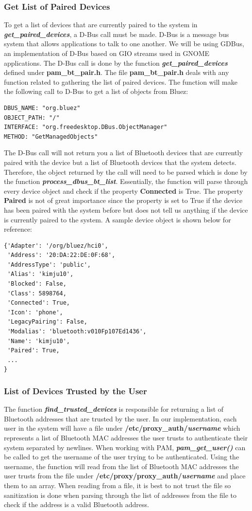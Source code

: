 \documentclass[letterpaper,twocolumn,10pt]{article}
\begin{document}
\subsubsection{Get List of Paired Devices}
To get a list of devices that are currently paired to the system in \textbf{\emph{get\_paired\_devices}}, a D-Bus call must be made. D-Bus is a message bus system that allows applications to talk to one another. We will be using GDBus, an implementation of D-Bus based on GIO streams used in GNOME applications. The D-Bus call is done by the function \textbf{\emph{get\_paired\_devices}} defined under \textbf{pam\_bt\_pair.h}. The file \textbf{pam\_bt\_pair.h} deals with any function related to gathering the list of paired devices. The function will make the following call to D-Bus to get a list of objects from Bluez: 
{\small
\begin{lstlisting}
DBUS_NAME: "org.bluez"
OBJECT_PATH: "/"
INTERFACE: "org.freedesktop.DBus.ObjectManager"
METHOD: "GetManagedObjects"
\end{lstlisting}
}
The D-Bus call will not return you a list of Bluetooth devices that are currently paired with the device but a list of Bluetooth devices that the system detects. Therefore, the object returned by the call will need to be parsed which is done by the function \textbf{\emph{process\_dbus\_bt\_list}}. Essentially, the function will parse through every device object and check if the property \textbf{Connected} is True. The property \textbf{Paired} is not of great importance since the property is set to True if the device has been paired with the system before but does not tell us anything if the device is currently paired to the system. A sample device object is shown below for reference:
{\small
\begin{lstlisting} 
{'Adapter': '/org/bluez/hci0',
 'Address': '20:DA:22:DE:0F:68',
 'AddressType': 'public',
 'Alias': 'kimju10',
 'Blocked': False,
 'Class': 5898764,
 'Connected': True,
 'Icon': 'phone',
 'LegacyPairing': False,
 'Modalias': 'bluetooth:v010Fp107Ed1436',
 'Name': 'kimju10',
 'Paired': True,
 ...
}
\end{lstlisting}
}
\subsubsection{List of Devices Trusted by the User}
The function \textbf{\emph{find\_trusted\_devices}} is responsible for returning a list of Bluetooth addresses that are trusted by the user. In our implementation, each user in the system will have a file under \textbf{/etc/proxy\_auth/\emph{username}} which represents a list of Bluetooth MAC addresses the user trusts to authenticate their system separated by newlines.
When working with PAM, \textbf{\emph{pam\_get\_user()}} can be called to get the username of the user trying to be authenticated. Using the username, the function will read from the list of Bluetooth MAC addresses the user trusts from the file under \textbf{/etc/proxy/proxy\_auth/\emph{username}} and place them to an array. When reading from a file, it is best to not trust the file so sanitization is done when parsing through the list of addresses from the file to check if the address is a valid Bluetooth address.
\end{document}
